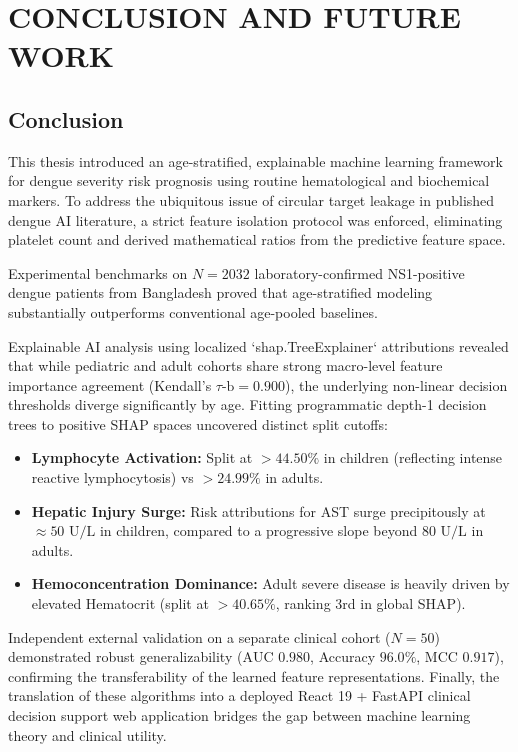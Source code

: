 \documentclass[12pt, a4paper]{report}
\begin{document}
\chapter{CONCLUSION AND FUTURE WORK}

\section{Conclusion}
This thesis introduced an age-stratified, explainable machine learning framework for dengue severity risk prognosis using routine hematological and biochemical markers. To address the ubiquitous issue of circular target leakage in published dengue AI literature, a strict feature isolation protocol was enforced, eliminating platelet count and derived mathematical ratios from the predictive feature space.

Experimental benchmarks on $N = 2032$ laboratory-confirmed NS1-positive dengue patients from Bangladesh proved that age-stratified modeling substantially outperforms conventional age-pooled baselines.

Explainable AI analysis using localized `shap.TreeExplainer` attributions revealed that while pediatric and adult cohorts share strong macro-level feature importance agreement (Kendall's $\tau\text{-b} = 0.900$), the underlying non-linear decision thresholds diverge significantly by age. Fitting programmatic depth-1 decision trees to positive SHAP spaces uncovered distinct split cutoffs:
\begin{itemize}
    \item \textbf{Lymphocyte Activation:} Split at $> 44.50\%$ in children (reflecting intense reactive lymphocytosis) vs $> 24.99\%$ in adults.
    \item \textbf{Hepatic Injury Surge:} Risk attributions for AST surge precipitously at $\approx 50\text{ U/L}$ in children, compared to a progressive slope beyond $80\text{ U/L}$ in adults.
    \item \textbf{Hemoconcentration Dominance:} Adult severe disease is heavily driven by elevated Hematocrit (split at $> 40.65\%$, ranking 3rd in global SHAP).
\end{itemize}

Independent external validation on a separate clinical cohort ($N = 50$) demonstrated robust generalizability ($\text{AUC } 0.980$, Accuracy $96.0\%$, MCC $0.917$), confirming the transferability of the learned feature representations. Finally, the translation of these algorithms into a deployed React 19 + FastAPI clinical decision support web application bridges the gap between machine learning theory and clinical utility.
\end{document}
